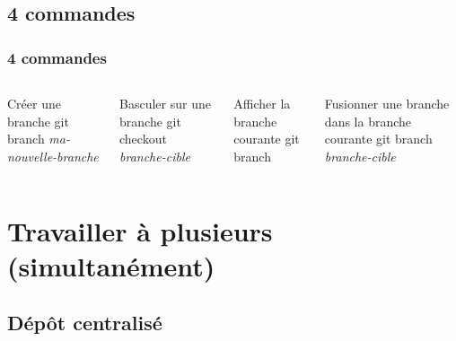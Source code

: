\documentclass[t,11pt]{beamer}
\begin{document}
\subsection{4 commandes}
\begin{frame}
        \frametitle{4 commandes}

        \begin{columns}

                \begin{block}{Créer une branche}
                        git branch \emph{ma-nouvelle-branche}
                \end{block}

                \begin{block}{Basculer sur une branche}
                        git checkout \emph{branche-cible}
                \end{block}


                \begin{block}{Afficher la branche courante}
                        git branch
                \end{block}

                \begin{block}{Fusionner une branche dans la branche courante}
                        git branch \emph{branche-cible}
                \end{block}

        \end{columns}

\end{frame}

\section{Travailler \`a plusieurs (simultan\'ement) }

\subsection{D\'ep\^ot centralis\'e}
\end{document}
